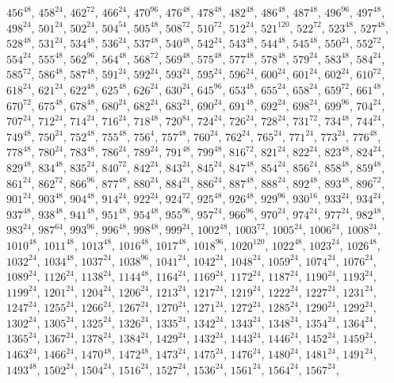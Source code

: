 \begin{itemize}
$456^{48}$, $458^{24}$, $462^{72}$, $466^{24}$, $470^{96}$, $476^{48}$, $478^{48}$, $482^{48}$, $486^{48}$, $487^{48}$, $496^{96}$, $497^{48}$, $498^{24}$, $501^{24}$, $502^{24}$, $504^{54}$, $505^{48}$, $508^{72}$, $510^{72}$, $512^{24}$, $521^{120}$, $522^{72}$, $523^{48}$, $527^{48}$, $528^{48}$, $531^{24}$, $534^{48}$, $536^{24}$, $537^{48}$, $540^{48}$, $542^{24}$, $543^{48}$, $544^{48}$, $545^{48}$, $550^{24}$, $552^{72}$, $554^{24}$, $555^{48}$, $562^{96}$, $564^{48}$, $568^{72}$, $569^{48}$, $575^{48}$, $577^{48}$, $578^{48}$, $579^{24}$, $583^{48}$, $584^{24}$, $585^{72}$, $586^{48}$, $587^{48}$, $591^{24}$, $592^{24}$, $593^{24}$, $595^{24}$, $596^{24}$, $600^{24}$, $601^{24}$, $602^{24}$, $610^{72}$, $618^{24}$, $621^{24}$, $622^{48}$, $625^{48}$, $626^{24}$, $630^{24}$, $645^{96}$, $653^{48}$, $655^{24}$, $658^{24}$, $659^{72}$, $661^{48}$, $670^{72}$, $675^{48}$, $678^{48}$, $680^{24}$, $682^{24}$, $683^{24}$, $690^{24}$, $691^{48}$, $692^{24}$, $698^{24}$, $699^{96}$, $704^{24}$, $707^{24}$, $712^{24}$, $714^{24}$, $716^{24}$, $718^{48}$, $720^{84}$, $724^{24}$, $726^{24}$, $728^{24}$, $731^{72}$, $734^{48}$, $744^{24}$, $749^{48}$, $750^{24}$, $752^{48}$, $755^{48}$, $756^{4}$, $757^{48}$, $760^{24}$, $762^{24}$, $765^{24}$, $771^{24}$, $773^{24}$, $776^{48}$, $778^{48}$, $780^{24}$, $783^{48}$, $786^{24}$, $789^{24}$, $791^{48}$, $799^{48}$, $816^{72}$, $821^{24}$, $822^{24}$, $823^{48}$, $824^{24}$, $829^{48}$, $834^{48}$, $835^{24}$, $840^{72}$, $842^{24}$, $843^{24}$, $845^{24}$, $847^{48}$, $854^{24}$, $856^{24}$, $858^{48}$, $859^{48}$, $861^{24}$, $862^{72}$, $866^{96}$, $877^{48}$, $880^{24}$, $884^{24}$, $886^{24}$, $887^{48}$, $888^{24}$, $892^{48}$, $893^{48}$, $896^{72}$, $901^{24}$, $903^{48}$, $904^{48}$, $914^{24}$, $922^{24}$, $924^{72}$, $925^{48}$, $926^{48}$, $929^{96}$, $930^{16}$, $933^{24}$, $934^{24}$, $937^{48}$, $938^{48}$, $941^{48}$, $951^{48}$, $954^{48}$, $955^{96}$, $957^{24}$, $966^{96}$, $970^{24}$, $974^{24}$, $977^{24}$, $982^{48}$, $983^{24}$, $987^{64}$, $993^{96}$, $996^{48}$, $998^{48}$, $999^{24}$, $1002^{48}$, $1003^{72}$, $1005^{24}$, $1006^{24}$, $1008^{24}$, $1010^{48}$, $1011^{48}$, $1013^{48}$, $1016^{48}$, $1017^{48}$, $1018^{96}$, $1020^{120}$, $1022^{48}$, $1023^{24}$, $1026^{48}$, $1032^{24}$, $1034^{48}$, $1037^{24}$, $1038^{96}$, $1041^{24}$, $1042^{24}$, $1048^{24}$, $1059^{24}$, $1074^{24}$, $1076^{24}$, $1089^{24}$, $1126^{24}$, $1138^{24}$, $1144^{48}$, $1164^{24}$, $1169^{24}$, $1172^{24}$, $1187^{24}$, $1190^{24}$, $1193^{24}$, $1199^{24}$, $1201^{24}$, $1204^{24}$, $1206^{24}$, $1213^{24}$, $1217^{24}$, $1219^{24}$, $1222^{24}$, $1227^{24}$, $1231^{24}$, $1247^{24}$, $1255^{24}$, $1266^{24}$, $1267^{24}$, $1270^{24}$, $1271^{24}$, $1272^{24}$, $1285^{24}$, $1290^{24}$, $1292^{24}$, $1302^{24}$, $1305^{24}$, $1325^{24}$, $1326^{24}$, $1335^{24}$, $1342^{24}$, $1343^{24}$, $1348^{24}$, $1354^{24}$, $1364^{24}$, $1365^{24}$, $1367^{24}$, $1378^{24}$, $1384^{24}$, $1429^{24}$, $1432^{24}$, $1443^{24}$, $1446^{24}$, $1452^{24}$, $1459^{24}$, $1463^{24}$, $1466^{24}$, $1470^{48}$, $1472^{48}$, $1473^{24}$, $1475^{24}$, $1476^{24}$, $1480^{24}$, $1481^{24}$, $1491^{24}$, $1493^{48}$, $1502^{24}$, $1504^{24}$, $1516^{24}$, $1527^{24}$, $1536^{24}$, $1561^{24}$, $1564^{24}$, $1567^{24}$, 
\end{itemize}
